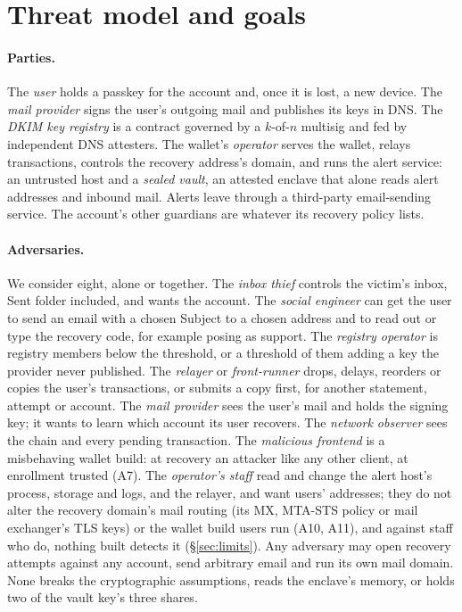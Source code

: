 \section{Threat model and goals}\label{sec:threat}

\paragraph{Parties.} The \emph{user} holds a passkey for the account and,
once it is lost, a new device. The \emph{mail provider} signs the user's
outgoing mail and publishes its keys in DNS. The \emph{DKIM key registry} is
a contract governed by a $k$-of-$n$ multisig and fed by independent DNS
attesters. The wallet's \emph{operator} serves the wallet, relays
transactions, controls the recovery address's domain, and runs the alert
service: an untrusted host and a \emph{sealed vault}, an attested enclave
that alone reads alert addresses and inbound mail. Alerts leave through a
third-party email-sending service. The account's other guardians are
whatever its recovery policy lists.

\paragraph{Adversaries.} We consider eight, alone or together. The
\emph{inbox thief} controls the victim's inbox, Sent folder included, and
wants the account. The \emph{social engineer} can get the user to send an
email with a chosen Subject to a chosen address and to read out or type the
recovery code, for example posing as support. The \emph{registry operator}
is registry members below the threshold, or a threshold of them adding a key
the provider never published. The \emph{relayer} or \emph{front-runner}
drops, delays, reorders or copies the user's transactions, or submits a copy
first, for another statement, attempt or account. The \emph{mail provider}
sees the user's mail and holds the signing key; it wants to learn which
account its user recovers. The \emph{network observer} sees the chain and
every pending transaction. The \emph{malicious frontend} is a misbehaving
wallet build: at recovery an attacker like any other client, at enrollment
trusted (A7). The \emph{operator's staff} read and change the alert host's
process, storage and logs, and the relayer, and want users' addresses; they
do not alter the recovery domain's mail routing (its MX, MTA-STS policy or
mail exchanger's TLS keys) or the wallet build users run (A10, A11), and
against staff who do, nothing built detects it (\S\ref{sec:limits}). Any adversary may open recovery
attempts against any account, send arbitrary email and run its own mail
domain. None breaks the cryptographic assumptions, reads the enclave's
memory, or holds two of the vault key's three shares.

